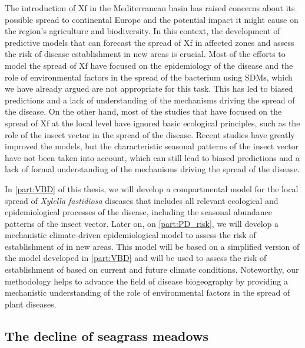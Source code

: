 The introduction of Xf in the Mediterranean basin has raised concerns about
its
possible spread to continental Europe and the potential impact it might cause
on the region's agriculture and biodiversity. In this context, the
development
of predictive models that can forecast the spread of Xf in affected zones and
assess the risk of disease establishment in new areas is crucial. Most of the
efforts to model the spread of Xf have focused on the epidemiology of the
disease and the role of environmental factors in the spread of the bacterium
using SDMs, which we have already argued are not appropriate for this
task. This has led to biased predictions and a lack of understanding of the
mechanisms driving the spread of the disease. On the other hand, most of the
studies that have focused on the spread of Xf at the local level have ignored
basic ecological principles, such as the role of the insect vector in the
spread of the disease. Recent studies have greatly improved the models, but
the
characteristic seasonal patterns of the insect vector have not been taken
into
account, which can still lead to biased predictions and a lack of formal
understanding of the mechanisms driving the spread of the disease.

In \cref{part:VBD} of this thesis, we will develop a compartmental model for
the local spread of \textit{Xylella fastidiosa} diseases that includes all
relevant ecological and epidemiological processes of the disease, including
the seasonal abundance patterns of the insect vector. Later on, on
\cref{part:PD_risk}, we will develop a mechanistic climate-driven
epidemiological model to assess the risk of establishment of \xf{} in new
areas. This model will be based on a simplified version of the model
developed
in \cref{part:VBD} and will be used to assess the risk of establishment of
\xf{} based on current and future climate conditions. Noteworthy, our
methodology helps to advance the field of disease biogeography by providing a
mechanistic understanding of the role of environmental factors in the spread
of plant diseases.

\subsection{\label{sec:The decline of seagrass meadows} The decline of
  seagrass
  meadows}


